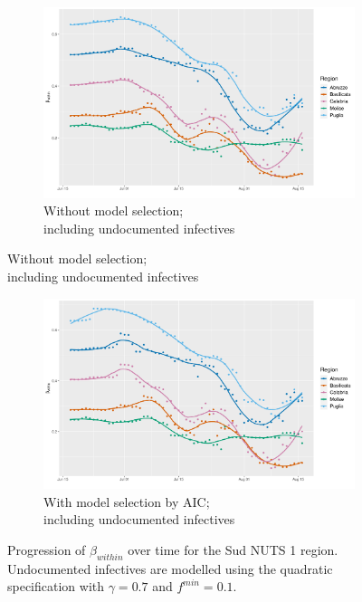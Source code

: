\documentclass[12pt]{article}
\begin{document}
\begin{appendices}
\begin{figure}[H]
    	\end{figure}
        \begin{figure}[H]\ContinuedFloat
    	    \begin{subfigure}{\textwidth}
    	      \centering
    	      \includegraphics[width=0.94\linewidth]{output/model_within_lag14_betawithin_Sud_UndocQuadratic_rolling.pdf}
    	      \caption{Without model selection; \\ including undocumented infectives}
    	      \label{fig:beta_within_over_time_sud_regular_undoc}
    	    \end{subfigure}\newline
        \end{figure}
        \begin{figure}[H]\ContinuedFloat
    	    \begin{subfigure}{\textwidth}
    	      \centering
    	      \includegraphics[width=0.94\linewidth]{output/model_within_lag14_betawithin_Sud_aic_UndocQuadratic_rolling.pdf}
    	      \caption{With model selection by AIC; \\ including undocumented infectives}
    	      \label{fig:beta_within_over_time_sud_aic_undoc}
    	    \end{subfigure}
    	    \caption{Progression of $\beta_{within}$ over time for the Sud NUTS 1 region. Undocumented infectives are modelled using the quadratic specification with $\gamma = 0.7$ and $f^{min}=0.1$.}
    	    \label{fig:beta_within_over_time_sud}
	    \end{figure}
		

\end{appendices}
\end{document}
